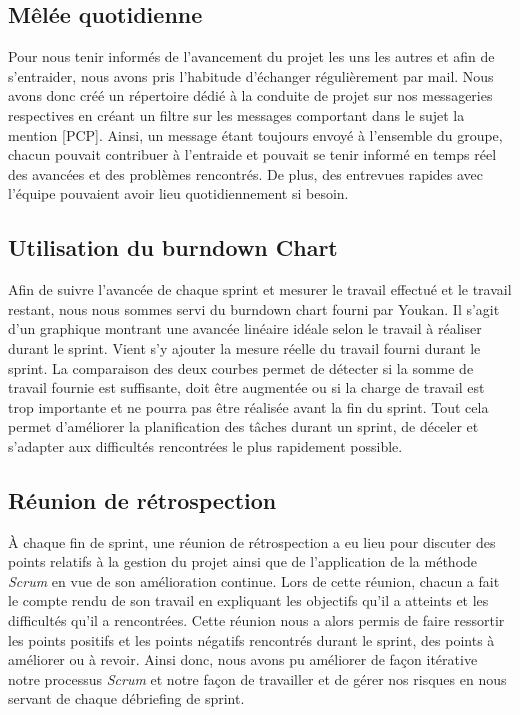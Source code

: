 \subsection{Mêlée quotidienne}

Pour nous tenir informés de l'avancement du projet les uns les autres et afin de s'entraider, nous avons pris l'habitude d'échanger régulièrement par mail. Nous avons donc créé un répertoire dédié à la conduite de projet sur nos messageries respectives en créant un filtre sur les messages comportant dans le sujet la mention [PCP].
Ainsi, un message étant toujours envoyé à l'ensemble du groupe, chacun pouvait contribuer à l'entraide et pouvait se tenir informé en temps réel des avancées et des problèmes rencontrés. De plus, des entrevues rapides avec l'équipe pouvaient avoir lieu quotidiennement si besoin.

\subsection{Utilisation du burndown Chart}

Afin de suivre l'avancée de chaque sprint et mesurer le travail effectué et le travail restant, nous nous sommes servi du burndown chart fourni par Youkan. Il s'agit d'un graphique montrant une avancée linéaire idéale selon le travail à réaliser durant le sprint. Vient s'y ajouter la mesure réelle du travail fourni durant le sprint. La comparaison des deux courbes permet de détecter si la somme de travail fournie est suffisante, doit être augmentée ou si la charge de travail est trop importante et ne pourra pas être réalisée avant la fin du sprint. Tout cela permet d'améliorer la planification des tâches durant un sprint, de déceler et s'adapter aux difficultés rencontrées le plus rapidement possible.

\subsection{Réunion de rétrospection}

À chaque fin de sprint, une réunion de rétrospection a eu lieu pour discuter des points relatifs à la gestion du projet ainsi que de l'application de la méthode \emph{Scrum} en vue de son amélioration continue. Lors de cette réunion, chacun a fait le compte rendu de son travail en expliquant les objectifs qu'il a atteints et les difficultés qu'il a rencontrées. Cette réunion nous a alors permis de faire ressortir les points positifs et les points négatifs rencontrés durant le sprint, des points à améliorer ou à revoir. Ainsi donc, nous avons pu améliorer de façon itérative notre processus \emph{Scrum} et notre façon de travailler et de gérer nos risques en nous servant de chaque débriefing de sprint.  